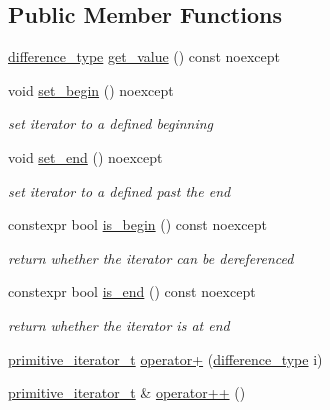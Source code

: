 \subsection*{Public Member Functions}
\begin{DoxyCompactItemize}
\item 
\hyperlink{classnlohmann_1_1basic__json_afe7c1303357e19cea9527af4e9a31d8f}{difference\+\_\+type} \hyperlink{classnlohmann_1_1basic__json_1_1primitive__iterator__t_a2839e2447370eb34f5db9d4e2a81c757}{get\+\_\+value} () const noexcept
\item 
void \hyperlink{classnlohmann_1_1basic__json_1_1primitive__iterator__t_ad1022740034c5cce15436ecb4620259d}{set\+\_\+begin} () noexcept
\begin{DoxyCompactList}\small\item\em set iterator to a defined beginning \end{DoxyCompactList}\item 
void \hyperlink{classnlohmann_1_1basic__json_1_1primitive__iterator__t_a2f42b499859a1d76d206bcdf0ed8a194}{set\+\_\+end} () noexcept
\begin{DoxyCompactList}\small\item\em set iterator to a defined past the end \end{DoxyCompactList}\item 
constexpr bool \hyperlink{classnlohmann_1_1basic__json_1_1primitive__iterator__t_a4a619406da55cf7bee028770ad02f26c}{is\+\_\+begin} () const noexcept
\begin{DoxyCompactList}\small\item\em return whether the iterator can be dereferenced \end{DoxyCompactList}\item 
constexpr bool \hyperlink{classnlohmann_1_1basic__json_1_1primitive__iterator__t_acab269d2efcbc29135f77f456ce2c3d2}{is\+\_\+end} () const noexcept
\begin{DoxyCompactList}\small\item\em return whether the iterator is at end \end{DoxyCompactList}\item 
\hyperlink{classnlohmann_1_1basic__json_1_1primitive__iterator__t}{primitive\+\_\+iterator\+\_\+t} \hyperlink{classnlohmann_1_1basic__json_1_1primitive__iterator__t_a08f5a9109131643f0227fe5fb9591c9b}{operator+} (\hyperlink{classnlohmann_1_1basic__json_afe7c1303357e19cea9527af4e9a31d8f}{difference\+\_\+type} i)
\item 
\hyperlink{classnlohmann_1_1basic__json_1_1primitive__iterator__t}{primitive\+\_\+iterator\+\_\+t} \& \hyperlink{classnlohmann_1_1basic__json_1_1primitive__iterator__t_a6963279f59254aada0eb71877d44d729}{operator++} ()

\end{DoxyCompactItemize}
